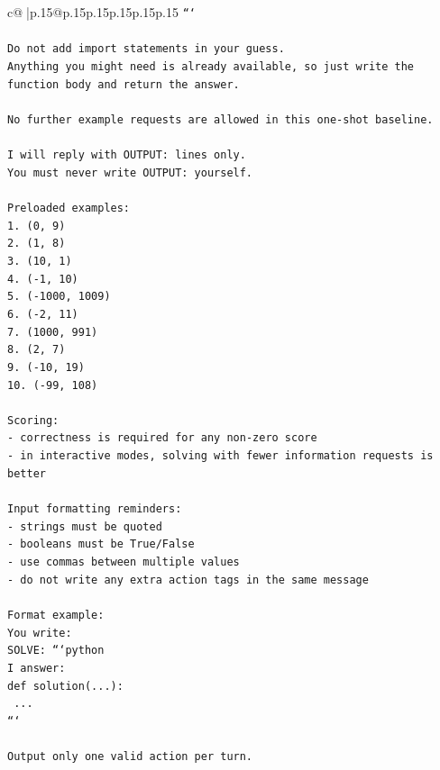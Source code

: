 \documentclass{article}
\begin{document}
{\begin{supertabular}{c@{$\;$}|p{.15\linewidth}@{}p{.15\linewidth}p{.15\linewidth}p{.15\linewidth}p{.15\linewidth}p{.15\linewidth}}
{{{\texttt{```} \\
\\ 
\texttt{Do not add import statements in your guess.} \\
\texttt{Anything you might need is already available, so just write the function body and return the answer.} \\
\\ 
\texttt{No further example requests are allowed in this one{-}shot baseline.} \\
\\ 
\texttt{I will reply with OUTPUT: lines only.} \\
\texttt{You must never write OUTPUT: yourself.} \\
\\ 
\texttt{Preloaded examples:} \\
\texttt{1. (0, 9)} \\
\texttt{2. (1, 8)} \\
\texttt{3. (10, 1)} \\
\texttt{4. ({-}1, 10)} \\
\texttt{5. ({-}1000, 1009)} \\
\texttt{6. ({-}2, 11)} \\
\texttt{7. (1000, 991)} \\
\texttt{8. (2, 7)} \\
\texttt{9. ({-}10, 19)} \\
\texttt{10. ({-}99, 108)} \\
\\ 
\texttt{Scoring:} \\
\texttt{{-} correctness is required for any non{-}zero score} \\
\texttt{{-} in interactive modes, solving with fewer information requests is better} \\
\\ 
\texttt{Input formatting reminders:} \\
\texttt{{-} strings must be quoted} \\
\texttt{{-} booleans must be True/False} \\
\texttt{{-} use commas between multiple values} \\
\texttt{{-} do not write any extra action tags in the same message} \\
\\ 
\texttt{Format example:} \\
\texttt{You write:} \\
\texttt{SOLVE: ```python} \\
\texttt{I answer:} \\
\texttt{def solution(...):} \\
\texttt{    ...} \\
\texttt{```} \\
\\ 
\texttt{Output only one valid action per turn.} \\
            }
        }
    }
     \\ \\


\end{supertabular}}
\end{document}
